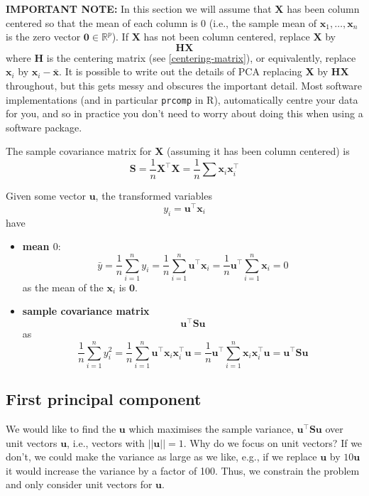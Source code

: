 \documentclass[]{book}
\theoremstyle{definition}
\theoremstyle{definition}
\theoremstyle{definition}
\theoremstyle{remark}
\begin{document}
\textbf{IMPORTANT NOTE:}
In this section we will assume that \(\boldsymbol X\) has been column centered so that the mean of each column is \(0\) (i.e., the sample mean of \(\boldsymbol x_1,\ldots,\boldsymbol x_n\) is the zero vector \(\boldsymbol 0\in \mathbb{R}^p\)). If \(\boldsymbol X\) has not been column centered, replace \(\boldsymbol X\) by
\[\boldsymbol H\boldsymbol X\] where \(\boldsymbol H\) is the centering matrix (see \ref{centering-matrix}), or equivalently, replace \(\boldsymbol x_i\) by \(\boldsymbol x_i - \bar{\boldsymbol x}\). It is possible to write out the details of PCA replacing \(\boldsymbol X\) by \(\boldsymbol H\boldsymbol X\) throughout, but this gets messy and obscures the important detail. Most software implementations (and in particular \texttt{prcomp} in R), automatically centre your data for you, and so in practice you don't need to worry about doing this when using a software package.

The sample covariance matrix for \(\boldsymbol X\) (assuming it has been column centered) is
\[\boldsymbol S= \frac{1}{n}\boldsymbol X^\top \boldsymbol X= \frac{1}{n}\sum \boldsymbol x_i\boldsymbol x_i^\top\]

Given some vector \(\boldsymbol u\), the transformed variables
\[y_i = \boldsymbol u^\top \boldsymbol x_i\]
have

\begin{itemize}
\item
  \textbf{mean \(0\)}:
  \[\bar{y}= \frac{1}{n}\sum_{i=1}^n y_i = \frac{1}{n}\sum_{i=1}^n \boldsymbol u^\top \boldsymbol x_i =\frac{1}{n} \boldsymbol u^\top \sum_{i=1}^n  \boldsymbol x_i = 0\]
  as the mean of the \(\boldsymbol x_i\) is \(\boldsymbol 0\).
\item
  \textbf{sample covariance matrix} \[\boldsymbol u^\top \boldsymbol S\boldsymbol u\]
  as
  \[\frac{1}{n} \sum_{i=1}^n y_i^2 = \frac{1}{n} \sum_{i=1}^n \boldsymbol u^\top \boldsymbol x_i \boldsymbol x_i^\top\boldsymbol u= \frac{1}{n}\boldsymbol u^\top \sum_{i=1}^n  \boldsymbol x_i \boldsymbol x_i^\top \boldsymbol u= \boldsymbol u^\top \boldsymbol S\boldsymbol u
  \]
\end{itemize}

\hypertarget{first-principal-component}{%
\subsection{First principal component}\label{first-principal-component}}

We would like to find the \(\boldsymbol u\) which maximises the sample variance, \(\boldsymbol u^\top \boldsymbol S\boldsymbol u\) over unit vectors \(\boldsymbol u\), i.e., vectors with \(||\boldsymbol u||=1\). Why do we focus on unit vectors? If we don't, we could make the variance as large as we like, e.g., if we replace \(\boldsymbol u\) by \(10\boldsymbol u\) it would increase the variance by a factor of 100. Thus, we constrain the problem and only consider unit vectors for \(\boldsymbol u\).
\end{document}
